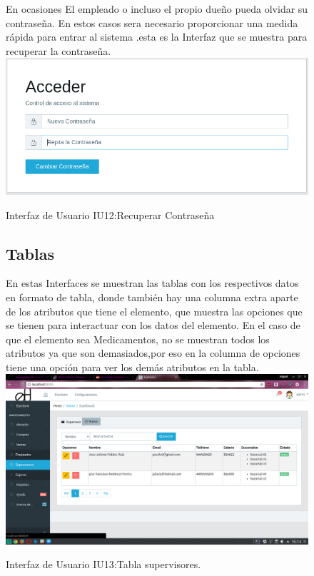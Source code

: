 \begin{figure}[htbp!]
	\begin{center}
	En ocasiones El empleado o incluso el propio dueño pueda olvidar su contraseña.
En estos casos sera necesario proporcionar una medida rápida para entrar al sistema .esta es la Interfaz que se muestra para recuperar la contraseña.
\includegraphics[width=\textwidth]{Pantallas/RecuperarContra}
		\caption{Interfaz de Usuario IU12:Recuperar Contraseña}
	\end{center}
\end{figure}




\begin{figure}[htbp!]
	\begin{center}
	\subsection{Tablas}
En estas Interfaces se muestran las tablas con los respectivos datos en formato
de tabla, donde también hay una columna extra aparte de los atributos que tiene el elemento, que muestra las opciones que se tienen para interactuar con los datos
del elemento. En el caso de que el elemento sea Medicamentos, no se muestran todos los atributos ya que son demasiados,por eso en la columna de opciones tiene una opción para ver los demás atributos en la tabla.
\includegraphics[width=\textwidth]{Pantallas/tablaSupervisores}
		\caption{Interfaz de Usuario IU13:Tabla supervisores.}
	\end{center}
\end{figure}




